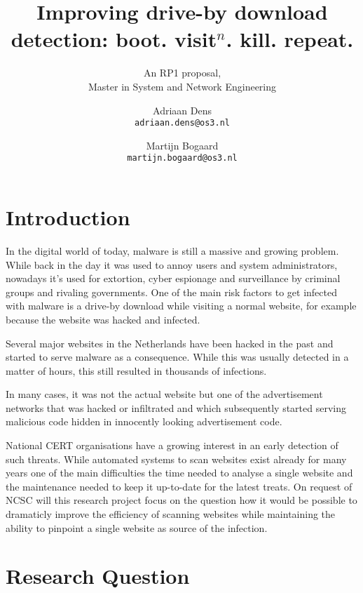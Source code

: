 \documentclass{scrartcl}
\title{Improving drive-by download detection: boot. visit$^n$. kill. repeat.}
\subtitle{An RP1 proposal,\\Master in System and Network Engineering}
\author{
  Adriaan Dens\\
   \texttt{adriaan.dens@os3.nl}
  \and
  Martijn Bogaard\\
   \texttt{martijn.bogaard@os3.nl}
}
\begin{document}
\maketitle

\section{Introduction}

In the digital world of today, malware is still a massive and growing problem. While back in the day it was used to annoy users and system administrators, nowadays it's used for extortion, cyber espionage and surveillance by criminal groups and rivaling governments. One of the main risk factors to get infected with malware is a drive-by download while visiting a normal website, for example because the website was hacked and infected. 

Several major websites in the Netherlands have been hacked in the past and started to serve malware as a consequence. While this was usually detected in a matter of hours, this still resulted in thousands of infections.

In many cases, it was not the actual website but one of the advertisement networks that was hacked or infiltrated and which subsequently started serving malicious code hidden in innocently looking advertisement code.


National CERT organisations have a growing interest in an early detection of such threats. While automated systems to scan websites exist already for many years one of the main difficulties the time needed to analyse a single website and the maintenance needed to keep it up-to-date for the latest treats. On request of NCSC will this research project focus on the question how it would be possible to dramaticly improve the efficiency of scanning websites while maintaining the ability to pinpoint a single website as source of the infection.

\section{Research Question}
\end{document}
